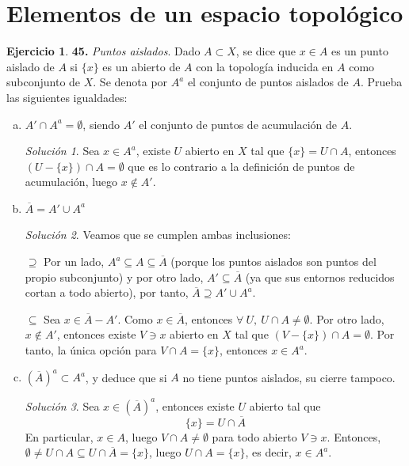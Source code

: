 \documentclass[12pt,twoside]{report}
\theoremstyle{azul}
\theoremstyle{azul2}
\theoremstyle{plain}
\theoremstyle{definition}
\newtheorem*{ejer}{Ejercicio}
\theoremstyle{remark}
\newtheorem*{sol}{Solución}
\begin{document}
\section{Elementos de un espacio topológico}
\begin{ejer}
    \textbf{45. } \textit{Puntos aislados}. Dado $A \subset X$, se dice que $x \in A$ es un punto aislado de $A$ si $\{x\}$ es un abierto de $A$ con la topología inducida en $A$ como subconjunto de $X$. Se denota por $A^a$ el conjunto de puntos aislados de $A$. Prueba las siguientes igualdades:
    \begin{enumerate}[a)]
        \item $A' \cap A^a = \emptyset$, siendo $A'$ el conjunto de puntos de acumulación de $A$.
        \begin{sol}
            Sea $x \in A^a$, existe $U$ abierto en $X$ tal que $\{x\}=U \cap A$, entonces \\ $(U-\{x\})\cap A = \emptyset$ que es lo contrario a la definición de puntos de acumulación, luego $x \nin A'$. 
        \end{sol}
        \item $\overline{A}=A' \cup A^a$ 
\begin{sol} Veamos que se cumplen ambas inclusiones:
    
        $\boxed{\supseteq}$ Por un lado, $A^a \subseteq A \subseteq \overline{A}$ (porque los puntos aislados son puntos del propio subconjunto) y por otro lado, $A' \subseteq \overline{A}$ (ya que sus entornos reducidos cortan a todo abierto), por tanto, $\overline{A} \supseteq A' \cup A^a$.

        $\boxed{\subseteq}$ Sea $x \in \overline{A}-A'$. Como $x \in \overline{A}$, entonces $\forall \: U, \: U \cap A \neq \emptyset$. Por otro lado, $x \nin A'$, entonces existe $V \ni x$ abierto en $X$ tal que $(V-\{x\})\cap A = \emptyset$. Por tanto, la única opción para $V \cap A=\{x\}$, entonces $x \in A^a$.       
\end{sol}
        \item $(\overline{A})^a \subset A^a$, y deduce que si $A$ no tiene puntos aislados, su cierre tampoco.
        \begin{sol}
            Sea $x \in (\overline{A})^a$, entonces existe $U$ abierto tal que $$\{x\}=U \cap \overline{A}$$
            En particular, $x \in A$, luego $V \cap A \neq \emptyset$ para todo abierto $V\ni x$. Entonces, \\ $\emptyset \neq U \cap A \subseteq U \cap \overline{A} = \{x\}$, luego $U \cap A = \{x\}$, es decir, $x \in A^a$.
        \end{sol}
    \end{enumerate}
\end{ejer}
\end{document}
